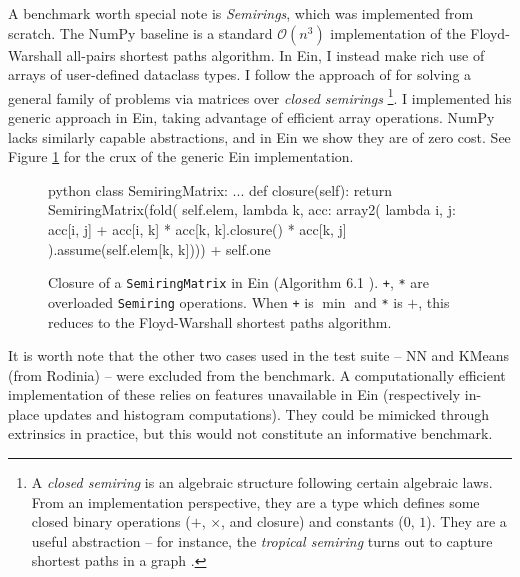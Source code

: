 A benchmark worth special note is \textit{Semirings}, which was implemented from scratch. 
The NumPy baseline is a standard $\mathcal O(n^3)$ implementation of the Floyd-Warshall all-pairs shortest paths algorithm. 
In Ein, I instead make rich use of arrays of user-defined dataclass types. 
I follow the approach of \textcite{dolan2013fun} for solving a general family of problems via matrices over \textit{closed semirings}%
\footnote{A \textit{closed semiring} is an algebraic structure following certain algebraic laws.
From an implementation perspective, they are a type which defines some closed binary operations ($+$, $\times$, and closure) and constants ($0$, $1$).
They are a useful abstraction -- for instance, the \textit{tropical semiring} turns out to capture shortest paths in a graph \cite{lehmann1977algebraic}.}.
I implemented his generic approach in Ein, taking advantage of efficient array operations.
NumPy lacks similarly capable abstractions, and in Ein we show they are of zero cost.
See Figure \ref{fig:semirings} for the crux of the generic Ein implementation.

\begin{figure}
    \centering
\begin{cminted}{python}
class SemiringMatrix:
    ...
    def closure(self):
        return SemiringMatrix(fold(
            self.elem,
            lambda k, acc: array2(
                lambda i, j: acc[i, j] + acc[i, k] * acc[k, k].closure() * acc[k, j]
        ).assume(self.elem[k, k]))) + self.one
\end{cminted}
    \caption{Closure of a \texttt{SemiringMatrix} in Ein (Algorithm 6.1 \cite{abdali1985transitive}). \texttt{+}, \texttt{*} are overloaded \texttt{Semiring} operations. When \texttt{+} is $\min$ and \texttt{*} is $+$, this reduces to the Floyd-Warshall shortest paths algorithm.}
    \label{fig:semirings}
\end{figure}

It is worth note that the other two cases used in the test suite -- NN and KMeans (from Rodinia) -- were excluded from the benchmark. A computationally efficient implementation of these relies on features unavailable in Ein (respectively in-place updates and histogram computations). They could be mimicked through extrinsics in practice, but this would not constitute an informative benchmark.

